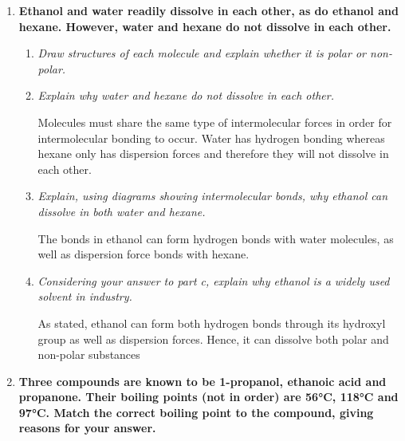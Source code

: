 \documentclass{report}
\begin{document}
\begin{enumerate}
		\item \textbf{Ethanol and water readily dissolve in each other, as do ethanol and hexane. However, water and hexane do not dissolve in each other.}

			\begin{enumerate}
				\item \textit{Draw structures of each molecule and explain whether it is polar or non-polar.}

					\begin{center}
					\end{center}
					\begin{center}
					\end{center}
					\begin{center}
					\end{center}

				\item \textit{Explain why water and hexane do not dissolve in each other.}

					Molecules must share the same type of intermolecular forces in order for intermolecular bonding to occur. Water has hydrogen bonding whereas hexane only has dispersion forces and therefore they will not dissolve in each other.

				\item \textit{Explain, using diagrams showing intermolecular bonds, why ethanol can dissolve in both water and hexane.}

					The  bonds in ethanol can form hydrogen bonds with water molecules, as well as dispersion force bonds with hexane.

				\item \textit{Considering your answer to part c, explain why ethanol is a widely used solvent in industry.}

					As stated, ethanol can form both hydrogen bonds through its hydroxyl group as well as dispersion forces. Hence, it can dissolve both polar and non-polar substances
			\end{enumerate}

		\newpage

		\item \textbf{Three compounds are known to be 1-propanol, ethanoic acid and propanone. Their boiling points (not in order) are 56°C, 118°C and 97°C. Match the correct boiling point to the compound, giving reasons for your answer.}


\end{enumerate}
\end{document}
